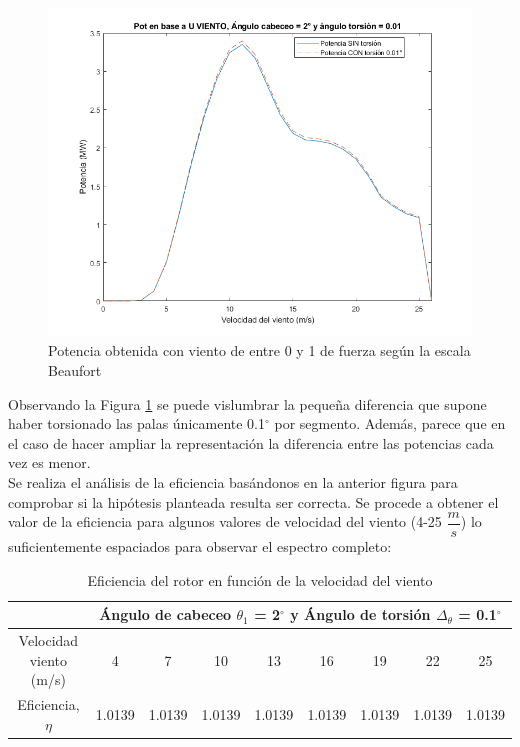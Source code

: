 \begin{figure}[H]
    \centering
    \includegraphics[width=1\textwidth]{images/0-10beau CP bueno.png}
    \caption{Potencia obtenida con viento de entre 0 y 1 de fuerza según la escala Beaufort}
     \label{fig:0-10beaufort_primertest}
\end{figure}

Observando la Figura \ref{fig:0-10beaufort_primertest} se puede vislumbrar la pequeña diferencia que supone haber torsionado las palas únicamente 0.1$^{\circ}$ por segmento. Además, parece que en el caso de hacer ampliar la representación la diferencia entre las potencias cada vez es menor.\\

Se realiza el análisis de la eficiencia basándonos en la anterior figura para comprobar si la hipótesis planteada resulta ser correcta. Se procede a obtener el valor de la eficiencia para algunos valores de velocidad del viento (4-25 $\dfrac{m}{s}$) lo suficientemente espaciados para observar el espectro completo:

\begin{table}[H]
\centering
\begin{tabular}{c|cccccccc|}
\cline{2-9}
\multicolumn{1}{l|}{} &
  \multicolumn{8}{c|}{Ángulo de cabeceo $\theta_1$ = 2$^{\circ}$ y Ángulo de torsión $\Delta_\theta$ = 0.1$^{\circ}$} \\ \hline
\multicolumn{1}{|c|}{Velocidad viento (m/s)} &
  \multicolumn{1}{c|}{4} &
  \multicolumn{1}{c|}{7} &
  \multicolumn{1}{c|}{10} &
  \multicolumn{1}{c|}{13} &
  \multicolumn{1}{c|}{16} &
  \multicolumn{1}{c|}{19} &
  \multicolumn{1}{c|}{22} &
  25 \\ \hline
\multicolumn{1}{|c|}{Eficiencia, $\eta$} &
  \multicolumn{1}{c|}{1.0139} &
  \multicolumn{1}{c|}{1.0139} &
  \multicolumn{1}{c|}{1.0139} &
  \multicolumn{1}{c|}{1.0139} &
  \multicolumn{1}{c|}{1.0139} &
  \multicolumn{1}{c|}{1.0139} &
  \multicolumn{1}{c|}{1.0139} &
  1.0139 \\ \hline
\end{tabular}
    \caption{Eficiencia del rotor en función de la velocidad del viento}
     \label{tabla:eficiencia_primer_intento}
\end{table}

